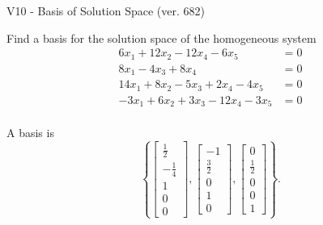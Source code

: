 \begin{exercise}
  \begin{exerciseTitle}V10 - Basis of Solution Space (ver. 682)\end{exerciseTitle}
  \begin{exerciseStatement}
    Find a basis for the solution space of the homogeneous system 
\begin{align*}
 6 x_ 1 + 12 x_ 2 -12 x_ 4 -6 x_ 5 &= 0  \\ 
  8 x_ 1 -4 x_ 3 + 8 x_ 4 &= 0  \\ 
  14 x_ 1 + 8 x_ 2 -5 x_ 3 + 2 x_ 4 -4 x_ 5 &= 0  \\ 
  -3 x_ 1 + 6 x_ 2 + 3 x_ 3 -12 x_ 4 -3 x_ 5 &= 0  \\ 
 \end{align*}


 
  \end{exerciseStatement}

  \begin{exerciseAnswer}
   A basis is   
\[\left\{\left[\begin{array}{c}
\frac{1}{2} \\
-\frac{1}{4} \\
1 \\
0 \\
0
\end{array}\right] , \left[\begin{array}{c}
-1 \\
\frac{3}{2} \\
0 \\
1 \\
0
\end{array}\right] , \left[\begin{array}{c}
0 \\
\frac{1}{2} \\
0 \\
0 \\
1
\end{array}\right]\right\}.\]

  


  \end{exerciseAnswer}
\end{exercise}